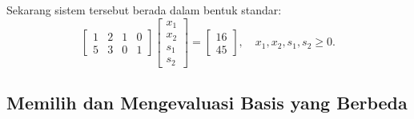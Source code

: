 Sekarang sistem tersebut berada dalam bentuk standar:
\[
\begin{bmatrix}
    1 & 2 & 1 & 0 \\
    5 & 3 & 0 & 1
\end{bmatrix}
\begin{bmatrix}
    x_1 \\ x_2 \\ s_1 \\ s_2
\end{bmatrix}
=
\begin{bmatrix}
    16 \\ 45
\end{bmatrix}, \quad x_1, x_2, s_1, s_2 \geq 0.
\]

\subsection{Memilih dan Mengevaluasi Basis yang Berbeda}
\label{sec:three-bases}

